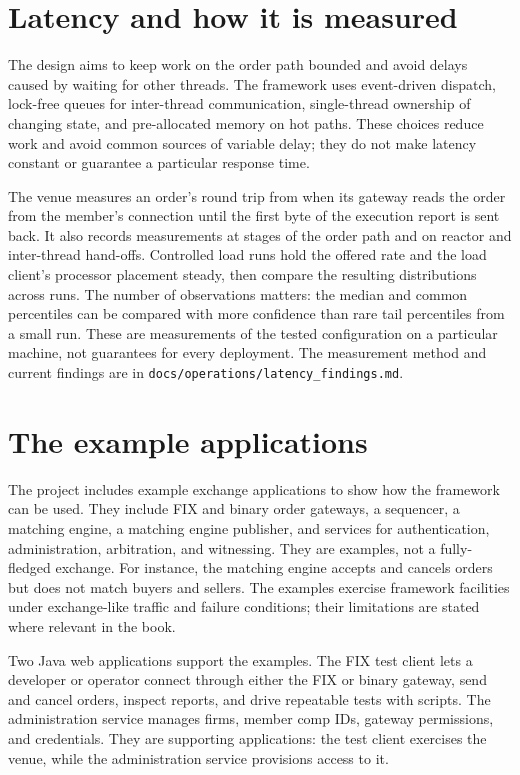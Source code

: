 \section{Latency and how it is measured}
\label{sec:introduction:latency}

The design aims to keep work on the order path bounded and avoid delays caused
by waiting for other threads. The framework uses event-driven dispatch,
lock-free queues for inter-thread communication, single-thread ownership of
changing state, and pre-allocated memory on hot paths. These choices reduce
work and avoid common sources of variable delay; they do not make latency
constant or guarantee a particular response time.

The venue measures an order's round trip from when its gateway reads the
order from the member's connection until the first byte of the execution
report is sent back. It also records measurements at stages of the order path
and on reactor and inter-thread hand-offs. Controlled load runs hold the
offered rate and the load client's processor placement steady, then compare
the resulting distributions across runs. The number of observations matters:
the median and common percentiles can be compared with more confidence than
rare tail percentiles from a small run. These are measurements of the tested
configuration on a particular machine, not guarantees for every deployment.
The measurement method and current findings are in
\texttt{docs/operations/latency\_findings.md}.

\section{The example applications}
\label{sec:introduction:applications}

The project includes example exchange applications to show how the framework
can be used. They include FIX and binary order gateways, a sequencer, a
matching engine, a matching engine publisher, and services for authentication,
administration, arbitration, and witnessing. They are examples, not a
fully-fledged exchange. For instance, the matching engine accepts and cancels
orders but does not match buyers and sellers. The examples exercise framework
facilities under exchange-like traffic and failure conditions; their
limitations are stated where relevant in the book.

Two Java web applications support the examples. The FIX test client lets a
developer or operator connect through either the FIX or binary gateway, send
and cancel orders, inspect reports, and drive repeatable tests with scripts.
The administration service manages firms, member comp IDs, gateway
permissions, and credentials. They are supporting applications: the test
client exercises the venue, while the administration service provisions
access to it.

